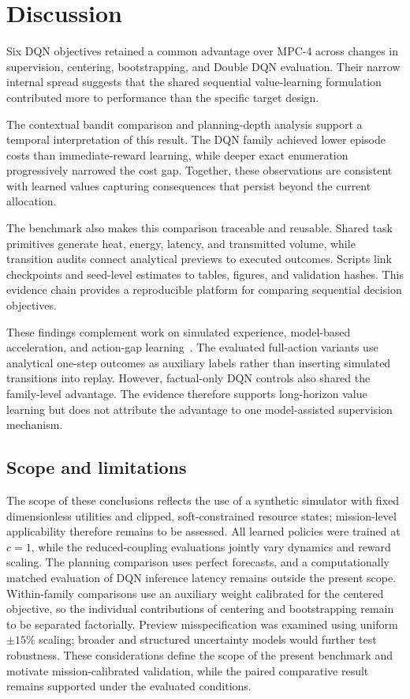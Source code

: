 \documentclass[remotesensing,article,submit,moreauthors]{Definitions/mdpi}
\begin{document}
\section{Discussion}

Six DQN objectives retained a common advantage over MPC-4 across changes in supervision, centering, bootstrapping, and Double DQN evaluation. Their narrow internal spread suggests that the shared sequential value-learning formulation contributed more to performance than the specific target design.

The contextual bandit comparison and planning-depth analysis support a temporal interpretation of this result. The DQN family achieved lower episode costs than immediate-reward learning, while deeper exact enumeration progressively narrowed the cost gap. Together, these observations are consistent with learned values capturing consequences that persist beyond the current allocation.

The benchmark also makes this comparison traceable and reusable. Shared task primitives generate heat, energy, latency, and transmitted volume, while transition audits connect analytical previews to executed outcomes. Scripts link checkpoints and seed-level estimates to tables, figures, and validation hashes. This evidence chain provides a reproducible platform for comparing sequential decision objectives.

These findings complement work on simulated experience, model-based acceleration, and action-gap learning~\cite{sutton1991dyna,gu2016continuous,bellemare2016gap}. The evaluated full-action variants use analytical one-step outcomes as auxiliary labels rather than inserting simulated transitions into replay. However, factual-only DQN controls also shared the family-level advantage. The evidence therefore supports long-horizon value learning but does not attribute the advantage to one model-assisted supervision mechanism.

\subsection{Scope and limitations}

The scope of these conclusions reflects the use of a synthetic simulator with fixed dimensionless utilities and clipped, soft-constrained resource states; mission-level applicability therefore remains to be assessed. All learned policies were trained at $c=1$, while the reduced-coupling evaluations jointly vary dynamics and reward scaling. The planning comparison uses perfect forecasts, and a computationally matched evaluation of DQN inference latency remains outside the present scope. Within-family comparisons use an auxiliary weight calibrated for the centered objective, so the individual contributions of centering and bootstrapping remain to be separated factorially. Preview misspecification was examined using uniform $\pm15\%$ scaling; broader and structured uncertainty models would further test robustness. These considerations define the scope of the present benchmark and motivate mission-calibrated validation, while the paired comparative result remains supported under the evaluated conditions.
\end{document}
